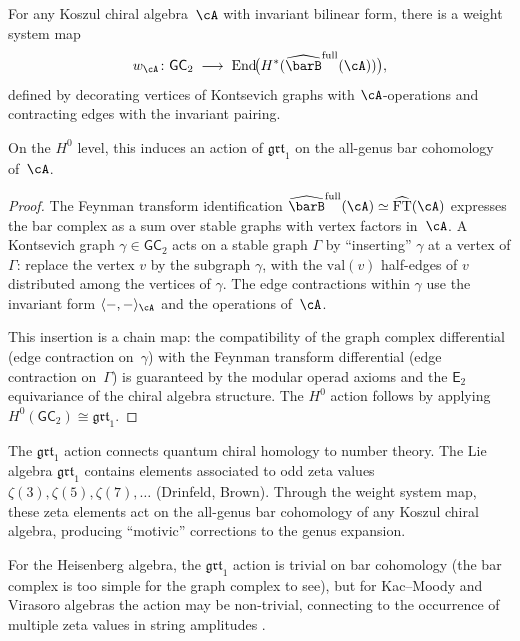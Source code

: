 \begin{proposition}\label{prop:weight-system-map}
For any Koszul chiral algebra~$\cA$ with invariant bilinear
form, there is a weight system map
\begin{equation}\label{eq:weight-system}
w_\cA \colon \mathsf{GC}_2
\;\longrightarrow\;
\mathrm{End}\!\bigl(
H^*(\widehat{\barB}^{\mathrm{full}}(\cA))
\bigr),
\end{equation}
defined by decorating vertices of Kontsevich graphs with
$\cA$-operations and contracting edges with the invariant
pairing.

On the $H^0$ level, this induces an action of $\mathfrak{grt}_1$
on the all-genus bar cohomology of~$\cA$.
\end{proposition}

\begin{proof}
The Feynman transform identification
$\widehat{\barB}^{\mathrm{full}}(\cA) \simeq
\widehat{\mathrm{FT}}(\cA)$ expresses
the bar complex as a sum over stable graphs with vertex factors
in~$\cA$. A Kontsevich graph $\gamma \in \mathsf{GC}_2$ acts on
a stable graph $\Gamma$ by ``inserting'' $\gamma$ at a vertex of
$\Gamma$: replace the vertex $v$ by the subgraph $\gamma$, with
the $\mathrm{val}(v)$ half-edges of $v$ distributed among the
vertices of $\gamma$. The edge contractions within $\gamma$ use
the invariant form $\langle -, - \rangle_\cA$ and the operations
of~$\cA$.

This insertion is a chain map: the compatibility of the graph
complex differential (edge contraction on~$\gamma$) with the
Feynman transform differential (edge contraction on~$\Gamma$) is
guaranteed by the modular operad axioms and the $\mathsf{E}_2$
equivariance of the chiral algebra structure. The $H^0$ action
follows by applying $H^0(\mathsf{GC}_2) \cong \mathfrak{grt}_1$.
\end{proof}

\begin{remark}%
\label{rem:qch-number-theory}
The $\mathfrak{grt}_1$ action connects quantum chiral homology to
number theory. The Lie algebra
$\mathfrak{grt}_1$ contains elements associated to odd zeta values
$\zeta(3), \zeta(5), \zeta(7), \ldots$ (Drinfeld, Brown).
Through the weight system map, these zeta elements act on the
all-genus bar cohomology of any Koszul chiral algebra, producing
``motivic'' corrections to the genus expansion.

For the Heisenberg algebra, the $\mathfrak{grt}_1$ action
is trivial on bar cohomology (the bar complex is too simple for
the graph complex to see), but for Kac--Moody and Virasoro
algebras the action may be non-trivial, connecting to the
occurrence of multiple zeta values in string amplitudes
\cite{Stieberger14,Schlotterer12}.
\end{remark}

